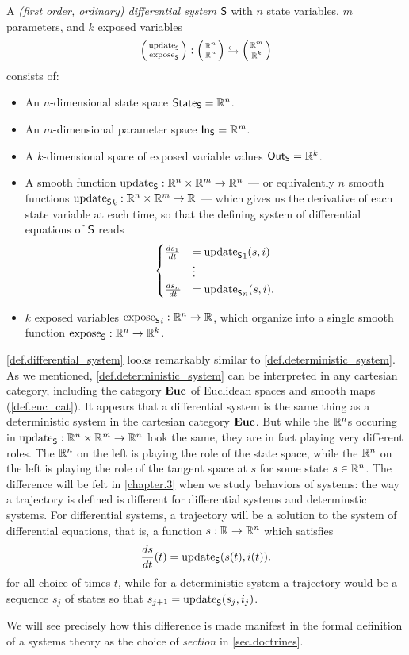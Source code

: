 \documentclass[DynamicalBook]{subfiles}
\begin{document}
\begin{definition}\label{def.differential_system}
  A \emph{(first order, ordinary) differential system} $\mathsf{S}$ with $n$ state variables, $m$
  parameters, and $k$ exposed variables 
\[
  \lens{\update{S}}{\expose{S}} : \lens{\rr^{n}}{\rr^n} \leftrightarrows \lens{\rr^m}{\rr^k}
\]
consists of:
\begin{itemize}
  \item An $n$-dimensional state space $\mathsf{State}_{\mathsf{S}} = \mathbb{R}^n$.
\item An $m$-dimensional parameter space $\mathsf{In}_{\mathsf{S}} = \mathbb{R}^m$.
\item A $k$-dimensional space of exposed variable values $\mathsf{Out}_{\mathsf{S}} = \mathbb{R}^k$.
\item A smooth function $\mathrm{update}_{\mathsf{S}} : \mathbb{R}^n \times \mathbb{R}^m \to \mathbb{R}^n$ --- or equivalently $n$ smooth functions ${ \mathrm{update}_{\mathsf{S}} }_{k} : \mathbb{R}^{n} \times \mathbb{R}^{m} \to \mathbb{R}$ --- which gives us the
  derivative of each state variable at each time, so that the defining
  system of differential equations of $\mathsf{S}$ reads
\[
\begin{cases}
\frac{ds_1}{dt} &= {\mathrm{update}_{\mathsf{S}}}_1(s,i) \\
&\vdots \\
\frac{ds_n}{dt} &= {\mathrm{update}_{\mathsf{S}}}_n(s, i).
\end{cases}
\]
\item $k$ exposed variables ${\mathrm{expose}_{\mathsf{S}}}_i : \mathbb{R}^n \to \mathbb{R}$, which organize into
  a single smooth function $\mathrm{expose}_{\mathsf{S}} : \mathbb{R}^n \to \mathbb{R}^k$.
\end{itemize}
\end{definition}


\begin{remark}
  \cref{def.differential_system} looks remarkably similar to
  \cref{def.deterministic_system}. As we mentioned,
  \cref{def.deterministic_system} can be interpreted in any cartesian category,
  including the category $\textbf{Euc}$ of Euclidean spaces and smooth maps
  (\cref{def.euc_cat}). It appears that a differential system is the same thing as a
  deterministic system in the cartesian category $\textbf{Euc}$. But while the
  $\mathbb{R}^n$s occuring in $\mathrm{update}_{\mathsf{S}} : \mathbb{R}^n \times \mathbb{R}^m \to \mathbb{R}^n$ look the
  same, they are in fact playing very different roles. The $\mathbb{R}^n$ on the left
  is playing the role of the state space, while the $\mathbb{R}^n$ on the left is
  playing the role of the tangent space at $s$ for some state $s \in \mathbb{R}^n$. The
  difference will be felt in \cref{chapter.3} when we study behaviors of
  systems: the way a trajectory is defined is different
  for differential systems and determinstic systems. For differential systems, a
  trajectory will be a solution to the system of differential equations, that
  is, a function $s : \mathbb{R} \to \mathbb{R}^n$ which satisfies 
$$\frac{ds}{dt}(t) = \mathrm{update}_{\mathsf{S}}(s(t), i(t)).$$
for all choice of times $t$, while for a deterministic system a trajectory would
be a sequence $s_j$ of states so that $s_{j + 1} = \mathrm{update}_{\mathsf{S}}(s_j, i_j)$. 

 We will see precisely how
  this difference is made manifest in the formal definition of a systems theory as the choice of \emph{section} in \cref{sec.doctrines}.
\end{remark}
\end{document}
